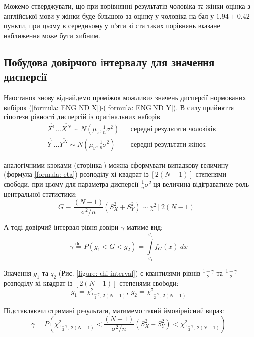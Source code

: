 Можемо стверджувати, що при порівнянні результатів чоловіка та жінки оцінка з англійської мови у жінки буде 
більшою за оцінку у чоловіка на бал у $1.94\pm 0.42$ пункти, при цьому в середньому у п'яти зі ста таких 
порівнянь вказане наближення може бути хибним.

\subsection{Побудова довірчого інтервалу для значення дисперсії}

Наостанок знову віднайдемо проміжок можливих значень дисперсії нормованих вибірок 
(\ref{formula: ENG ND X})-(\ref{formula: ENG ND Y}). В силу прийняття гіпотези рівності дисперсій 
із оригінальних наборів
\begin{align*}
    &\overline{X^1}\ldots \overline{X^N}\sim N(\mu_x,\tfrac{1}{n}\sigma^2) && \text{середні результати чоловіків} \\
    &\overline{Y^1}\ldots \overline{Y^N}\sim N(\mu_y,\tfrac{1}{n}\sigma^2) && \text{середні результати жінок}
\end{align*}

аналогічними кроками (сторінка \pageref{page: seaching central statistic}) можна сформувати 
випадкову величину (формула \ref{formula: eta}) розподілу хі-квадрат із $\left[ 2(N-1) \right]$ степенями свободи, 
при цьому для параметра дисперсії $\frac{1}{n}\sigma^2$ ця величина відіграватиме роль центральної статистики:
\begin{equation}
    G\equiv\frac{(N-1)}{\sigma^2/n}\left( S_X^2+S_Y^2 \right)\sim \chi^2\left[ 2(N-1) \right]
\end{equation}

А тоді довірчий інтервал рівня довіри $\gamma$ матиме вид:
\begin{equation}
    \gamma \overset{\mathrm{def}}{=} P(g_1<G<g_2)=\int\limits_{g_1}^{g_2}f_G(x)\ dx
\end{equation}

Значення $g_1$ та $g_2$ (Рис. \ref{figure: chi interval}) є квантилями рівнів $\frac{1-\gamma}{2}$ та 
$\frac{1+\gamma}{2}$ розподілу хі-квадрат із $\left[ 2(N-1) \right]$ степенями свободи:
\begin{equation*}
    g_1=\chi^2_{\tfrac{1-\gamma}{2};\ 2(N-1)},\  
    g_2=\chi^2_{\tfrac{1+\gamma}{2};\ 2(N-1)}   
\end{equation*}

Підставляючи отримані результати, матимемо такий ймовірнісний вираз:
\begin{equation}
    \gamma = P\left( 
        \chi^2_{\tfrac{1-\gamma}{2};\ 2(N-1)} < 
        \frac{(N-1)}{\sigma^2/n}\left( S_X^2+S_Y^2 \right) < 
        \chi^2_{\tfrac{1+\gamma}{2};\ 2(N-1)} 
    \right) \label{formula: ENG chi trusted interval}
\end{equation}

